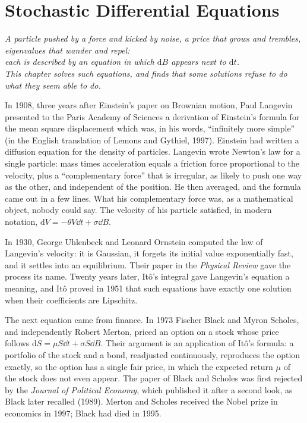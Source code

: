 \chapter{Stochastic Differential Equations}

\begin{center}\itshape
A particle pushed by a force and kicked by noise, a price that grows and trembles, eigenvalues that wander and repel:\\
each is described by an equation in which $\mathrm dB$ appears next to $\mathrm dt$.\\
This chapter solves such equations, and finds that some solutions refuse to do what they seem able to do.
\end{center}

In 1908, three years after Einstein's paper on Brownian motion, Paul Langevin presented to the Paris Academy of Sciences a derivation of Einstein's formula for the mean square displacement which was,
in his words, ``infinitely more simple'' (in the English translation of Lemons and Gythiel, 1997). Einstein had written a diffusion equation for the density of particles. Langevin wrote Newton's law for
a single particle: mass times acceleration equals a friction force proportional to the velocity, plus a ``complementary force'' that is irregular, as likely to push one way as the other, and
independent of the position. He then averaged, and the formula came out in a few lines. What his complementary force was, as a mathematical object, nobody could say. The velocity of his particle
satisfied, in modern notation, $\mathrm dV=-\theta V\dd t+\sigma\dd B$.

In 1930, George Uhlenbeck and Leonard Ornstein computed the law of Langevin's velocity: it is Gaussian, it forgets its initial value exponentially fast, and it settles into an equilibrium. Their paper
in the \emph{Physical Review} gave the process its name. Twenty years later, It\^o's integral gave Langevin's equation a meaning, and It\^o proved in 1951 that such equations have exactly one solution
when their coefficients are Lipschitz.

The next equation came from finance. In 1973 Fischer Black and Myron Scholes, and independently Robert Merton, priced an option on a stock whose price follows $\mathrm dS=\mu S\dd t+\sigma S\dd B$. Their
argument is an application of It\^o's formula: a portfolio of the stock and a bond, readjusted continuously, reproduces the option exactly, so the option has a single fair price, in which the
expected return $\mu$ of the stock does not even appear. The paper of Black and Scholes was first rejected by the \emph{Journal of Political Economy}, which published it after a second look, as Black
later recalled (1989). Merton and Scholes received the Nobel prize in economics in 1997; Black had died in 1995.

